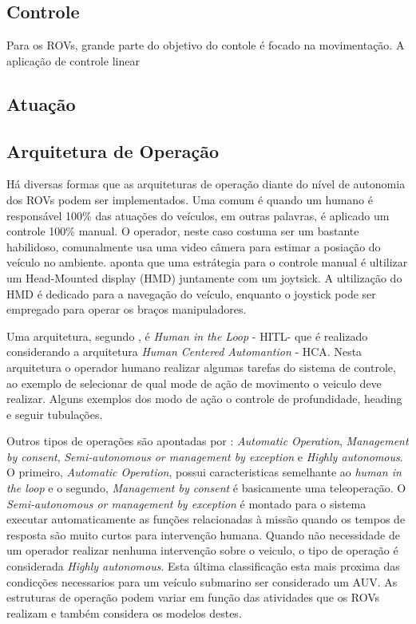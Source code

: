 


\subsection{Controle}
Para os ROVs, grande parte do objetivo do contole é focado na movimentação. A aplicação de controle linear 

\subsection{Atuação}

\subsection{Arquitetura de Operação}
Há diversas formas que as arquiteturas de operação diante do nível de autonomia dos ROVs podem ser implementados. Uma comum é quando um humano é responsável 100\% das atuações do veículos, em outras palavras, é aplicado um controle 100\% manual. O operador, neste caso costuma ser um bastante habilidoso, comunalmente usa uma video câmera para estimar a posiação do veículo no ambiente. \cite{Towards} aponta que uma estrátegia para o controle manual é ultilizar um Head-Mounted display (HMD) juntamente com um joytsick. A ultilização do HMD é dedicado para a navegação do veículo, enquanto o joystick pode ser empregado para operar os braços manipuladores.

Uma arquitetura, segundo \cite{wireless_joy}, é \textit{Human in the Loop} - HITL- que é realizado considerando a arquitetura \textit{Human Centered Automantion} - HCA. Nesta arquitetura o operador humano realizar algumas tarefas do sistema de controle, ao exemplo de selecionar de qual mode de ação de movimento o veiculo deve realizar. Alguns exemplos dos modo de ação o controle de profundidade, heading e seguir tubulações.

Outros tipos de operações são apontadas por \cite{Towards}: \textit{Automatic Operation}, \textit{Management by consent}, \textit{Semi-autonomous or management by exception} e \textit{Highly autonomous}. O primeiro, \textit{Automatic Operation}, possui caracteristicas semelhante ao \textit{human in the loop} e o segundo, \textit{Management by consent} é basicamente uma teleoperação. O \textit{Semi-autonomous or management by exception} é montado para o sistema executar automaticamente as funções relacionadas à missão quando os tempos de resposta são muito curtos para intervenção humana.  Quando não necessidade de um operador realizar nenhuma intervenção sobre o veiculo, o tipo de operação é considerada \textit{Highly autonomous}. Esta última classificação esta mais proxima das condicções necessarios para um veículo submarino ser considerado um AUV. As estruturas de operação podem variar em função das atividades que os ROVs realizam e também considera os modelos destes. 








